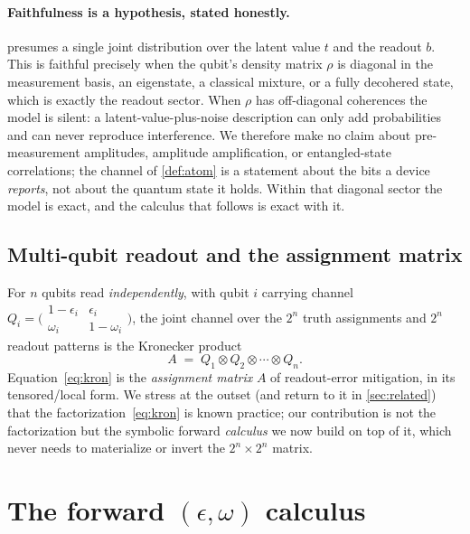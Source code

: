 \documentclass[12pt]{article}
\numberwithin{equation}{section}
\theoremstyle{plain}
\theoremstyle{definition}
\theoremstyle{remark}
\newcommand{\eps}{\epsilon}
\newcommand{\tensor}{\otimes}
\begin{document}
\paragraph{Faithfulness is a hypothesis, stated honestly.}
 presumes a single joint distribution over the latent value $t$
and the readout $b$. This is faithful precisely when the qubit's density matrix
$\rho$ is diagonal in the measurement basis, an eigenstate, a classical
mixture, or a fully decohered state, which is exactly the readout sector. When
$\rho$ has off-diagonal coherences the model is silent: a latent-value-plus-noise
description can only add probabilities and can never reproduce interference. We
therefore make no claim about pre-measurement amplitudes, amplitude
amplification, or entangled-state correlations; the channel of \cref{def:atom}
is a statement about the bits a device \emph{reports}, not about the quantum
state it holds. Within that diagonal sector the model is exact, and the calculus
that follows is exact with it.

\subsection{Multi-qubit readout and the assignment matrix}

For $n$ qubits read \emph{independently}, with qubit $i$ carrying channel
$Q_i=\bigl(\begin{smallmatrix}1-\eps_i & \eps_i\\ \omega_i & 1-\omega_i\end{smallmatrix}\bigr)$,
the joint channel over the $2^n$ truth assignments and $2^n$ readout patterns is
the Kronecker product
\begin{equation}
\label{eq:kron}
  A \;=\; Q_1 \tensor Q_2 \tensor \cdots \tensor Q_n .
\end{equation}
Equation~\eqref{eq:kron} is the \emph{assignment matrix} $A$ of readout-error
mitigation, in its tensored/local form. We stress at the outset (and return to
it in \cref{sec:related}) that the factorization~\eqref{eq:kron} is known
practice; our contribution is not the factorization but the symbolic forward
\emph{calculus} we now build on top of it, which never needs to materialize or
invert the $2^n\times2^n$ matrix.


\section{The forward \texorpdfstring{$(\eps,\omega)$}{(epsilon, omega)} calculus}
\label{sec:calculus}
\end{document}
